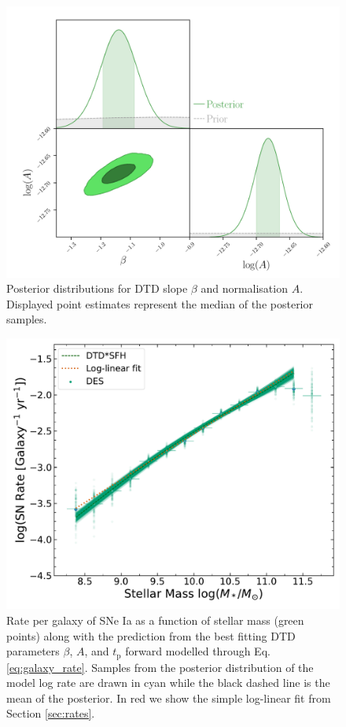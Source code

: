 \documentclass[fleqn,usenatbib]{mnras}
\begin{document}
\begin{figure}
    \centering
    \includegraphics[width=.5\textwidth]{figs/fit_dtd_all_A_beta_corner.pdf}
    \caption{Posterior distributions for DTD slope $\beta$ and normalisation $A$. Displayed point estimates represent the median of the posterior samples.%
    \label{fig:corner_beta_norm}}
\end{figure}
\begin{figure}
    \centering
    \includegraphics[width=.5\textwidth]{figs/rate_vs_mass_DTD_fit_beta_norm_Qerf1.1.pdf}
    \caption{Rate per galaxy of SNe Ia as a function of stellar mass (green points) along with the prediction from the best fitting DTD parameters $\beta$, $A$, and $t_{\mathrm{p}}$ forward modelled through Eq. \ref{eq:galaxy_rate}. Samples from the posterior distribution of the model log rate are drawn in cyan while the black dashed line is the mean of the posterior. In red we show the simple log-linear fit from Section \ref{sec:rates}.%
    \label{fig:rate_fitted}}
\end{figure}
\end{document}
